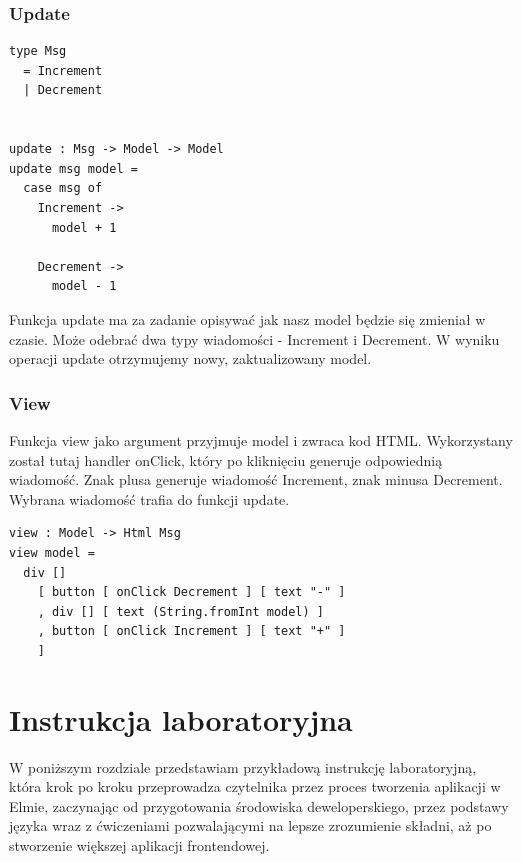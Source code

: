 \documentclass[twoside,a4paper]{book}
\begin{document}
\subsection{Update}
\begin{minipage}{.45\textwidth}
\lstset{frame=single}
\begin{lstlisting}[caption={Update},label=kod:Update]
type Msg
  = Increment
  | Decrement


update : Msg -> Model -> Model
update msg model =
  case msg of
    Increment ->
      model + 1

    Decrement ->
      model - 1
\end{lstlisting}
\end{minipage}\hfill
\begin{minipage}{.45\textwidth}
Funkcja update ma za zadanie opisywać jak nasz model będzie się zmieniał w czasie. Może odebrać dwa typy wiadomości - Increment i Decrement. W wyniku operacji update otrzymujemy nowy, zaktualizowany model.
\end{minipage}\hfill
\subsection{View}
Funkcja view jako argument przyjmuje model i zwraca kod HTML. Wykorzystany został tutaj handler onClick, który po kliknięciu generuje odpowiednią wiadomość. Znak plusa generuje wiadomość Increment, znak minusa Decrement. Wybrana wiadomość trafia do funkcji update.

\lstset{frame=single}
\begin{lstlisting}[caption={View},label=kod:View]
view : Model -> Html Msg
view model =
  div []
    [ button [ onClick Decrement ] [ text "-" ]
    , div [] [ text (String.fromInt model) ]
    , button [ onClick Increment ] [ text "+" ]
    ]
\end{lstlisting}


\chapter{Instrukcja laboratoryjna}
W poniższym rozdziale przedstawiam przykładową instrukcję laboratoryjną, która krok po kroku przeprowadza czytelnika przez proces tworzenia aplikacji w Elmie, zaczynając od przygotowania środowiska deweloperskiego, przez podstawy języka wraz z ćwiczeniami pozwalającymi na lepsze zrozumienie składni, aż po stworzenie większej aplikacji frontendowej.
\end{document}
